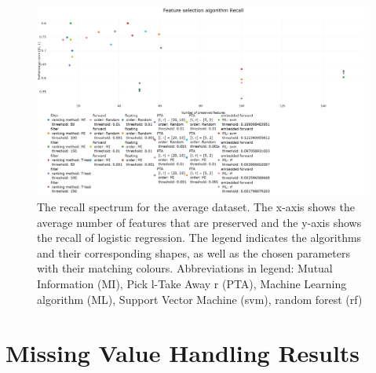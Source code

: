 \documentclass[10pt,a4paper]{report}
\begin{document}
	\begin{figure}[H]
		\centering
		\includegraphics[angle=90,height=1.4\textwidth]{Recall_new.png}
		\caption{The recall spectrum for the average dataset. The x-axis shows the average number of features that are preserved and the y-axis shows the recall of logistic regression. The legend indicates the algorithms and their corresponding shapes, as well as the chosen parameters with their matching colours. Abbreviations in legend: Mutual Information (MI), Pick l-Take Away r (PTA), Machine Learning algorithm (ML), Support Vector Machine (svm), random forest (rf)}
		\label{fig:Avg_Recall_Spectrum}
	\end{figure}
	
	\chapter{Missing Value Handling Results}
	
\end{document}
